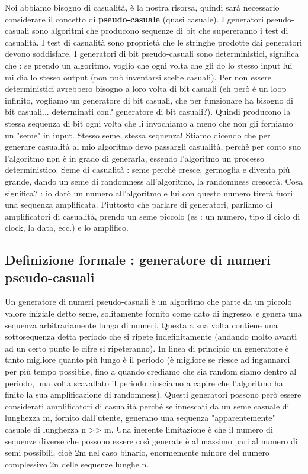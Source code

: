 Noi abbiamo bisogno di casualità, è la nostra risorsa, quindi sarà necessario considerare il concetto di \textbf{pseudo-casuale} (quasi casuale). I generatori pseudo-casuali sono algoritmi che producono sequenze di bit che supereranno i test di casualità.
I test di casualità sono proprietà che le stringhe prodotte dai generatori devono soddisfare.
I generatori di bit pseudo-casuali sono deterministici, significa che : se prendo un algoritmo, voglio che ogni volta che gli do lo stesso input lui mi dia lo stesso output (non può inventarsi scelte casuali). Per non essere deterministici avrebbero bisogno a loro volta di bit casuali (eh però è un loop infinito, vogliamo un generatore di bit casuali, che per funzionare ha bisogno di bit casuali... determinati con? generatore di bit casuali?). Quindi producono la stessa sequenza di bit ogni volta che li invochiamo a meno che non gli forniamo un "seme" in input. Stesso seme, stessa sequenza! Stiamo dicendo che per generare casualità al mio algoritmo devo passargli casualità, perchè per conto suo l'algoritmo non è in grado di generarla, essendo l'algoritmo un processo deterministico.
Seme di casualità : seme perchè cresce, germoglia e diventa più grande, dando un seme di randomness all'algoritmo, la randomness crescerà. Cosa significa? : io darò un numero all'algoritmo e lui con questo numero tirerà fuori una sequenza amplificata. Piuttosto che parlare di generatori, parliamo di amplificatori di casualità, prendo un seme piccolo (es : un numero, tipo il ciclo di clock, la data, ecc.) e lo amplifico.

\subsection{Definizione formale : generatore di numeri pseudo-casuali}

Un generatore di numeri pseudo-casuali è un algoritmo che parte da un piccolo valore iniziale detto seme, solitamente fornito come dato di
ingresso, e genera una sequenza arbitrariamente lunga di numeri. Questa a sua volta contiene una sottosequenza detta periodo che si ripete
indefinitamente (andando molto avanti ad un certo punto le cifre si ripeteranno). In linea di principio un generatore è tanto migliore quanto più lungo è il periodo (è migliore se riesce ad ingannarci per più tempo possibile, fino a quando crediamo che sia random siamo dentro al periodo, una volta scavallato il periodo riusciamo a capire che l'algoritmo ha finito la sua amplificazione di randomness).
Questi generatori possono però essere considerati amplificatori di casualità perché se innescati da un seme casuale di lunghezza m, fornito dall’utente, generano una sequenza "apparentemente" casuale di lunghezza
n >> m. Una inerente limitazione è che il numero di sequenze diverse che possono essere così generate è al massimo pari al numero di semi possibili, cioè 2m nel caso binario, enormemente minore del numero complessivo 2n delle sequenze lunghe n.

